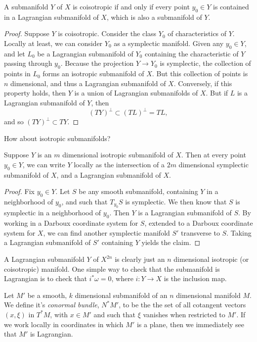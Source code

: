 \begin{theorem}
    A submanifold $Y$ of $X$ is coisotropic if and only if every point $y_0 \in Y$ is contained in a Lagrangian submanifold of $X$, which is also a submanifold of $Y$.
\end{theorem}
\begin{proof}
    Suppose $Y$ is coisotropic. Consider the class $Y_0$ of characteristics of $Y$. Locally at least, we can consider $Y_0$ as a symplectic manifold. Given any $y_0 \in Y$, and let $L_0$ be a Lagrangian submanifold of $Y_0$ containing the characteristic of $Y$ passing through $y_0$. Because the projection $Y \to Y_0$ is symplectic, the collection of points in $L_0$ forms an isotropic submanifold of $X$. But this collection of points is $n$ dimensional, and thus a Lagrangian submanifold of $X$. Conversely, if this property holds, then $Y$ is a union of Lagrangian submanifolds of $X$. But if $L$ is a Lagrangian submanifold of $Y$, then
    \[ (TY)^\perp \subset (TL)^\perp = TL, \]
    and so $(TY)^\perp \subset TY$.
\end{proof}

How about isotropic submanifolds?

\begin{theorem}
    Suppose $Y$ is an $m$ dimensional isotropic submanifold of $X$. Then at every point $y_0 \in Y$, we can write $Y$ locally as the intersection of a $2m$ dimensional symplectic submanifold of $X$, and a Lagrangian submanifold of $X$.
\end{theorem}
\begin{proof}
    Fix $y_0 \in Y$. Let $S$ be any smooth submanifold, containing $Y$ in a neighborhood of $y_0$, and such that $T_{y_0} S$ is symplectic. We then know that $S$ is symplectic in a neighborhood of $y_0$. Then $Y$ is a Lagrangian submanifold of $S$. By working in a Darboux coordinate system for $S$, extended to a Darboux coordinate system for $X$, we can find another symplectic manifold $S'$ transverse to $S$. Taking a Lagrangian submanifold of $S'$ containing $Y$ yields the claim.
\end{proof}

A Lagrangian submanifold $Y$ of $X^{2n}$ is clearly just an $n$ dimensional isotropic (or coisotropic) manifold. One simple way to check that the submanifold is Lagrangian is to check that $i^* \omega = 0$, where $i: Y \to X$ is the inclusion map.

\begin{example}
    Let $M'$ be a smooth, $k$ dimensional submanifold of an $n$ dimensional manifold $M$. We define it's \emph{conormal bundle}, $N^* M'$, to be the the set of all cotangent vectors $(x,\xi)$ in $T^* M$, with $x \in M'$ and such that $\xi$ vanishes when restricted to $M'$. If we work locally in coordinates in which $M'$ is a plane, then we immediately see that $M'$ is Lagrangian.
\end{example}

